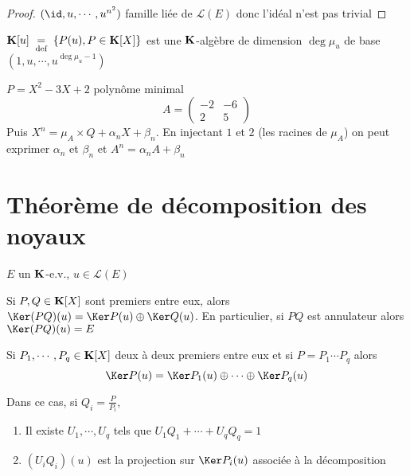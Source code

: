 \begin{proof}
    $(\id, u, \cdots, u^{n^2})$ famille liée de $\mathcal L(E)$ donc l'idéal n'est pas trivial
\end{proof}

\begin{prop}
    $\mathbf K[u]\;\underset{\text{def}}=\; \{P(u), P\in\mathbf K[X]\}$ est une $\mathbf K$-algèbre de dimension $\deg \mu_u$ de base $(1, u, \cdots, u^{\deg \mu_u-1})$
\end{prop}

\begin{ex}
    $P=X^2-3X+2$ polynôme minimal \[
        A= \begin{pmatrix}
            -2 & -6 \\ 2 & 5
        \end{pmatrix}
    \]
    Puis $X^n=\mu_A\times Q+\alpha_n X+\beta_n$. En injectant $1$ et $2$ (les racines de $\mu_A$) on peut exprimer $\alpha_n$ et $\beta_n$ et $A^n=\alpha_nA+\beta_n$
\end{ex}

\section{Théorème de décomposition des noyaux}

\begin{thm}
    \Hyp $E$ un $\mathbf K$-e.v., $u\in\mathcal L(E)$
    \begin{concenum}
    \item Si $P, Q\in\mathbf K[X]$ sont premiers entre eux, alors $\Ker (PQ)(u)=\Ker P(u)\oplus \Ker Q(u)$. En particulier, si $PQ$ est annulateur alors $\Ker(PQ)(u)=E$
    \item Si $P_1, \cdots, P_q\in\mathbf K[X]$ deux à deux premiers entre eux et si $P=P_1\cdots P_q$ alors \[
            \Ker P(u)=\Ker P_1(u)\oplus\cdots\oplus \Ker P_q(u)
        \]
    \item Dans ce cas, si $Q_i=\frac P{P_i}$, \begin{enumerate}
        \item Il existe $U_1, \cdots, U_q$ tels que $U_1Q_1+\cdots +U_qQ_q=1$
        \item $(U_iQ_i)(u)$ est la projection sur $\Ker P_i(u)$ associée à la décomposition
    \end{enumerate}
    \end{concenum}
\end{thm}

